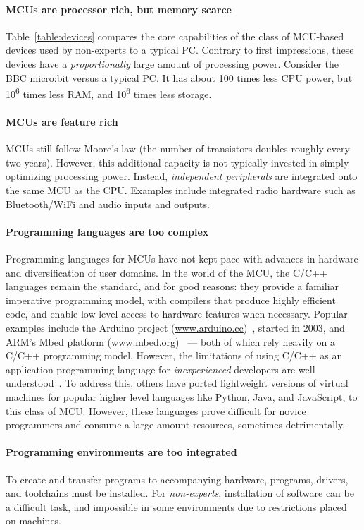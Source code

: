 \paragraph{MCUs are processor rich, but memory scarce}
Table~\ref{table:devices} compares the core capabilities of the class of MCU-based devices used by non-experts to a typical PC. Contrary to first impressions, these devices have a \emph{proportionally} large amount of processing power. Consider the BBC micro:bit versus a typical PC. It has about 100 times less CPU power, but 10\textsuperscript{6} times less RAM, and 10\textsuperscript{6} times less storage.

\paragraph{MCUs are feature rich} MCUs still follow Moore's law (the number of transistors doubles roughly every two years). However, this additional capacity is not typically invested in simply optimizing processing power. Instead, \emph{independent peripherals} are integrated onto the same MCU as the CPU. Examples include integrated radio hardware such as Bluetooth/WiFi and audio inputs and outputs.

\paragraph{Programming languages are too complex}
Programming languages for MCUs have not kept pace with advances in hardware and diversification of user domains. In the world of the MCU, the C/C++ languages remain the standard, and for good reasons: they provide a familiar imperative programming model, with compilers that produce highly efficient code, and enable low level access to hardware features when necessary. Popular examples include the Arduino project (\url{www.arduino.cc})~\cite{buildingArduino2014}, started in 2003, and ARM's Mbed platform (\url{www.mbed.org})~\cite{ARMmbed} --- both of which rely heavily on a C/C++ programming model. However, the limitations of using C/C++ as an application programming language for \emph{inexperienced} developers are well understood~\cite{blikstein2013gears}. To address this, others have ported lightweight versions of virtual machines for popular higher level languages like Python, Java, and JavaScript, to this class of MCU. However, these languages prove difficult for novice programmers and consume a large amount resources, sometimes detrimentally.

\paragraph{Programming environments are too integrated}
To create and transfer programs to accompanying hardware, programs, drivers, and toolchains must be installed. For \emph{non-experts}, installation of software can be a difficult task, and impossible in some environments due to restrictions placed on machines.


